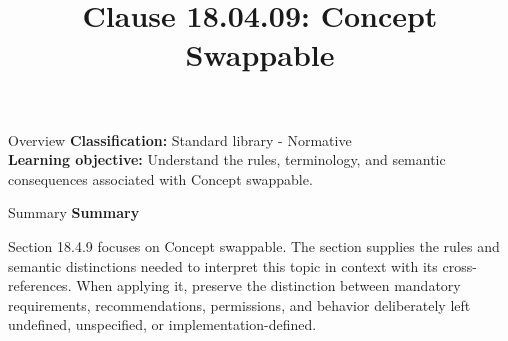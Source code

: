 \documentclass[10pt,letterpaper]{article}
\title{Clause 18.04.09: Concept Swappable}
\author{}
\date{}
\begin{document}
\maketitle
\begin{CornellOverviewBox}{Overview}
\textbf{Classification:} Standard library - Normative\\[2pt]
\textbf{Learning objective:} Understand the rules, terminology, and semantic consequences associated with Concept swappable.
\end{CornellOverviewBox}\begin{CornellSummaryBox}{Summary}
{\sffamily\bfseries\color{Accent} Summary}\par\vspace{3pt}Section 18.4.9 focuses on Concept swappable. The section supplies the rules and semantic distinctions needed to interpret this topic in context with its cross-references. When applying it, preserve the distinction between mandatory requirements, recommendations, permissions, and behavior deliberately left undefined, unspecified, or implementation-defined.
\end{CornellSummaryBox}
\end{document}
